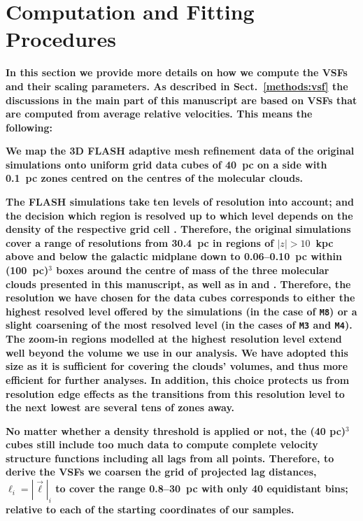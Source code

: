 \section{Computation and Fitting Procedures}\label{appFitting}

\textbf{
    In this section we provide more details on how we compute the VSFs and their scaling parameters.
    As described in Sect.~\ref{methods:vsf} the discussions in the main part of this manuscript are based on VSFs that are computed from average relative velocities. 
    This means the following:
}

\textbf{ 
    We map the 3D FLASH adaptive mesh refinement data of the original simulations  onto uniform grid data cubes of 40~pc on a side with 0.1~pc zones centred on the centres of the molecular clouds. 
}

\textbf{
    The FLASH simulations take ten levels of resolution into account; and the decision which region is resolved up to which level depends on the density of the respective grid cell .
    Therefore, the original simulations cover a range of resolutions from 30.4~pc in regions of $|z| > 10$~kpc above and below the galactic midplane down to 0.06--0.10~pc within (100~pc)$^3$ boxes around the centre of mass of the three molecular clouds presented in this manuscript, as well as in  and . 
    Therefore, the resolution we have chosen for the data cubes corresponds to either the highest resolved level offered by the simulations (in the case of \texttt{M8}) or a slight coarsening of the most resolved level (in the cases of \texttt{M3} and \texttt{M4}).
    The zoom-in regions modelled at the highest resolution level extend well beyond the volume we use in our analysis.
    We have adopted this size as it is sufficient for covering the clouds' volumes, and thus more efficient for further analyses. In addition, this choice protects us from resolution edge effects as the transitions from this resolution level to the next lowest are several tens of zones away. 
}

\textbf{
No matter whether a density threshold is applied or not, the (40 pc)$^3$ cubes still include too much data to compute complete velocity structure functions including all lags from all points.
Therefore, to derive the VSFs we coarsen the grid of projected lag distances, $\ell_i = |\vec{\ell}|_i$ to cover the range 0.8--30~pc with only 40 equidistant bins; relative to each of the starting coordinates of our samples. 
}

